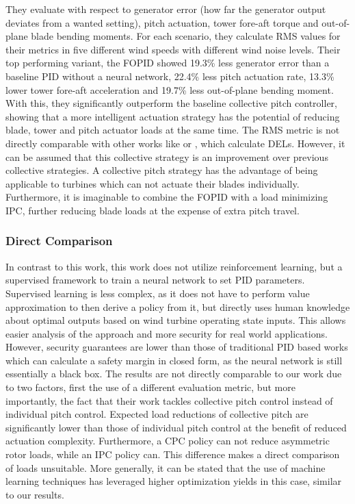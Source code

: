 They evaluate with respect to generator error (how far the generator output deviates from a wanted setting), pitch actuation, tower fore-aft torque and out-of-plane blade bending moments. For each scenario, they calculate \ac{RMS} values for their metrics in five different wind speeds with different wind noise levels. Their top performing variant, the FOPID showed 19.3\% less generator error than a baseline PID without a neural network, 22.4\% less pitch actuation rate, 13.3\% lower tower fore-aft acceleration and 19.7\% less out-of-plane bending moment. With this, they significantly outperform the baseline collective pitch controller, showing that a more intelligent actuation strategy has the potential of reducing blade, tower and pitch actuator loads at the same time. The \ac{RMS} metric is not directly comparable with other works like \citet{coqueletBiomimeticIndividualPitch2020} or \citet{bossanyiFurtherLoadReductions2005}, which calculate \acp{DEL}. However, it can be assumed that this collective strategy is an improvement over previous collective strategies. A collective pitch strategy has the advantage of being applicable to turbines which can not actuate their blades individually. Furthermore, it is imaginable to combine the FOPID with a load minimizing IPC, further reducing blade loads at the expense of extra pitch travel. 

\subsubsection{Direct Comparison}

In contrast to this work, this work does not utilize reinforcement learning, but a supervised framework to train a neural network to set PID parameters. Supervised learning is less complex, as it does not have to perform value approximation to then derive a policy from it, but directly uses human knowledge about optimal outputs based on wind turbine operating state inputs. This allows easier analysis of the approach and more security for real world applications. However, security guarantees are lower than those of traditional PID based works which can calculate a safety margin in closed form, as the neural network is still essentially a black box. The results are not directly comparable to our work due to two factors, first the use of a different evaluation metric, but more importantly, the fact that their work tackles collective pitch control instead of individual pitch control. Expected load reductions of collective pitch are significantly lower than those of individual pitch control at the benefit of reduced actuation complexity. Furthermore, a CPC policy can not reduce asymmetric rotor loads, while an IPC policy can. This difference makes a direct comparison of loads unsuitable. More generally, it can be stated that the use of machine learning techniques has leveraged higher optimization yields in this case, similar to our results.


